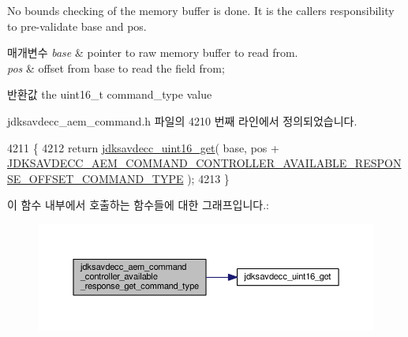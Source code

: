 No bounds checking of the memory buffer is done. It is the caller\textquotesingle{}s responsibility to pre-\/validate base and pos.


\begin{DoxyParams}{매개변수}
{\em base} & pointer to raw memory buffer to read from. \\
\hline
{\em pos} & offset from base to read the field from; \\
\hline
\end{DoxyParams}
\begin{DoxyReturn}{반환값}
the uint16\+\_\+t command\+\_\+type value 
\end{DoxyReturn}


jdksavdecc\+\_\+aem\+\_\+command.\+h 파일의 4210 번째 라인에서 정의되었습니다.


\begin{DoxyCode}
4211 \{
4212     \textcolor{keywordflow}{return} \hyperlink{group__endian_ga3fbbbc20be954aa61e039872965b0dc9}{jdksavdecc\_uint16\_get}( base, pos + 
      \hyperlink{group__command__controller__available__response_ga3ee7371078dc411c09593cf72c2f0d17}{JDKSAVDECC\_AEM\_COMMAND\_CONTROLLER\_AVAILABLE\_RESPONSE\_OFFSET\_COMMAND\_TYPE}
       );
4213 \}
\end{DoxyCode}


이 함수 내부에서 호출하는 함수들에 대한 그래프입니다.\+:
\nopagebreak
\begin{figure}[H]
\begin{center}
\leavevmode
\includegraphics[width=350pt]{group__command__controller__available__response_ga0112af13a303e3a8ac924cd7503a0b22_cgraph}
\end{center}
\end{figure}


